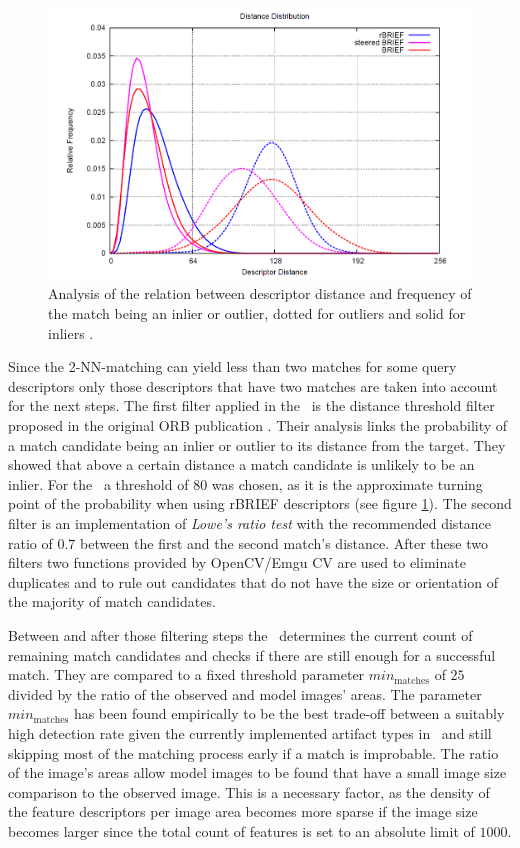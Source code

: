 \begin{figure}[h!]
	\centering
	\includegraphics[scale=0.3]{fig/distance_threshold_orb.png}
	\caption{Analysis of the relation between descriptor distance and frequency of the match being an inlier or outlier, dotted for outliers and solid for inliers \cite[p.~4]{orb}.}\label{fig:dist-thresh}
\end{figure}

Since the 2-NN-matching can yield less than two matches for some query descriptors only those descriptors that have two matches are taken into account for the next steps. The first filter applied in the \vd~is the distance threshold filter proposed in the original ORB publication \cite{orb}. Their analysis links the probability of a match candidate being an inlier or outlier to its distance from the target. They showed that above a certain distance a match candidate is unlikely to be an inlier. For the \vd~a threshold of $80$ was chosen, as it is the approximate turning point of the probability when using rBRIEF descriptors (see figure \ref{fig:dist-thresh}). The second filter is an implementation of \emph{Lowe's ratio test} \cite{lowes_ratio} with the recommended distance ratio of $0.7$ between the first and the second match's distance. After these two filters two functions provided by OpenCV/Emgu CV are used to eliminate duplicates and to rule out candidates that do not have the size or orientation of the majority of match candidates.

Between and after those filtering steps the \vd~determines the current count of remaining match candidates and checks if there are still enough for a successful match. They are compared to a fixed threshold parameter $min_{\text{matches}}$ of $25$ divided by the ratio of the observed and model images' areas. The parameter $min_{\text{matches}}$ has been found empirically to be the best trade-off between a suitably high detection rate given the currently implemented artifact types in \ape~and still skipping most of the matching process early if a match is improbable. The ratio of the image's areas allow model images to be found that have a small image size comparison to the observed image. This is a necessary factor, as the density of the feature descriptors per image area becomes more sparse if the image size becomes larger since the total count of features is set to an absolute limit of $1000$.

